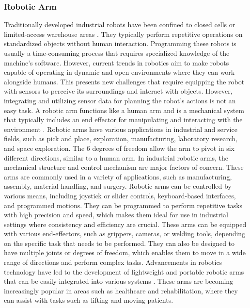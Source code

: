 \documentclass[12pt,oneside]{article}
\begin{document}
\subsubsection{Robotic Arm}
Traditionally developed industrial robots have been confined to closed cells or limited-access warehouse areas \cite{9_lucchi2020robo}. They typically perform repetitive operations on standardized objects without human interaction. Programming these robots is usually a time-consuming process that requires specialized knowledge of the machine's software. However, current trends in robotics aim to make robots capable of operating in dynamic and open environments where they can work alongside humans. This presents new challenges that require equipping the robot with sensors to perceive its surroundings and interact with objects. However, integrating and utilizing sensor data for planning the robot's actions is not an easy task.
A robotic arm functions like a human arm and is a mechanical system that typically includes an end effector for manipulating and interacting with the environment \cite{10_ohta2018design}. Robotic arms have various applications in industrial and service fields, such as pick and place, exploration, manufacturing, laboratory research, and space exploration. The 6 degrees of freedom allow the arm to pivot in six different directions, similar to a human arm. In industrial robotic arms, the mechanical structure and control mechanism are major factors of concern.
These arms are commonly used in a variety of applications, such as manufacturing, assembly, material handling, and surgery. Robotic arms can be controlled by various means, including joystick or slider controls, keyboard-based interfaces, and programmed motions. They can be programmed to perform repetitive tasks with high precision and speed, which makes them ideal for use in industrial settings where consistency and efficiency are crucial. These arms can be equipped with various end-effectors, such as grippers, cameras, or welding tools, depending on the specific task that needs to be performed. They can also be designed to have multiple joints or degrees of freedom, which enables them to move in a wide range of directions and perform complex tasks. Advancements in robotics technology have led to the development of lightweight and portable robotic arms that can be easily integrated into various systems \cite{11_singh2013evolution}. These arms are becoming increasingly popular in areas such as healthcare and rehabilitation, where they can assist with tasks such as lifting and moving patients.
\end{document}
